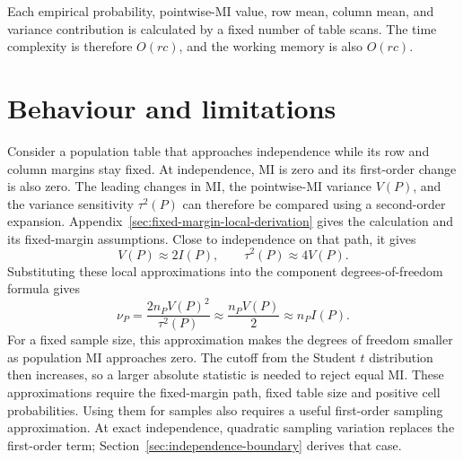 Each empirical probability, pointwise-MI value, row mean, column mean, and
variance contribution is calculated by a fixed number of table scans. The
time complexity is therefore \(O(rc)\), and the working memory is also
\(O(rc)\).

\section{Behaviour and limitations}
\label{sec:near-independence-mechanism}


Consider a population table that
approaches independence while its row and column margins stay fixed. At
independence, MI is zero and its first-order change is also zero. The
leading changes in MI, the pointwise-MI variance \(V(P)\), and the variance
sensitivity \(\tau^2(P)\) can therefore be compared using a second-order
expansion. Appendix~\ref{sec:fixed-margin-local-derivation} gives the
calculation and its fixed-margin assumptions. Close to independence on
that path, it gives
\begin{equation}
 V(P)\approx 2I(P),
 \qquad \tau^2(P)\approx4V(P).
 \label{eq:near-independent-moments}
\end{equation}
Substituting these local approximations into
the component degrees-of-freedom formula gives
\begin{equation}
 \nu_P=\frac{2n_PV(P)^2}{\tau^2(P)}
 \approx\frac{n_PV(P)}{2}
 \approx n_PI(P).
 \label{eq:near-independent-df}
\end{equation}
For a fixed sample size, this approximation makes the degrees of freedom
smaller as population MI approaches zero. The cutoff from the Student
\(t\) distribution then increases, so a larger absolute statistic is
needed to reject equal MI.
These approximations require the fixed-margin path, fixed table size and
positive cell probabilities. Using them for samples also requires a useful
first-order sampling approximation. At exact independence, quadratic sampling
variation replaces the first-order term; Section~\ref{sec:independence-boundary}
derives that case.

